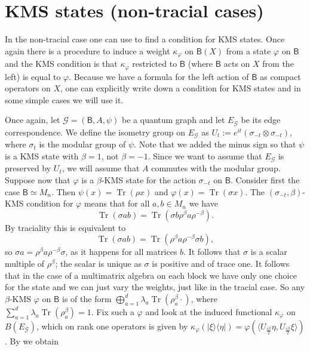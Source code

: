 \documentclass[a4paper,reqno]{amsart}
\numberwithin{equation}{section}
\numberwithin{theorem}{section}
\theoremstyle{definition}\newtheorem{definition}[theorem]{Definition}
\theoremstyle{definition}\newtheorem{remark}[theorem]{Remark}
\theoremstyle{definition}\newtheorem{example}[theorem]{Example}
\theoremstyle{definition}\newtheorem*{notation*}{Notation}
\theoremstyle{definition}\newtheorem*{convention*}{Convention}
\theoremstyle{definition}\newtheorem{observation}{Observation}
\theoremstyle{definition}\newtheorem*{acknowledgment*}{Acknowledgments}
\newcommand{\B}{\mathsf{B}}
\newcommand{\G}{\mathcal{G}}
\renewcommand{\op}[1]{\operatorname{#1}}
\begin{document}
\section{KMS states (non-tracial cases)}

In the non-tracial case one can use \cite[Theorem 3.2 and Theorem 3.5]{LN} to find a condition for KMS states. Once again there is a procedure to induce a weight $\kappa_{\varphi}$ on $\B(X)$ from a state $\varphi$ on $\B$ and the KMS condition is that $\kappa_{\varphi}$ restricted to $\B$ (where $\B$ acts on $X$ from the left) is equal to $\varphi$. Because we have a formula for the left action of $\B$ as compact operators on $X$, one can explicitly write down a condition for KMS states and in some simple cases we will use it.

Once again, let $\G=(\B,A,\psi)$ be a quantum graph and let $E_{\G}$ be its edge correspondence. We define the isometry group on $E_{\G}$ as $U_t := e^{it} (\sigma_{-t} \otimes \sigma_{-t})$, where $\sigma_{t}$ is the modular group of $\psi$. Note that  we added the minus sign so that $\psi$ is a KMS state with $\beta=1$, not $\beta=-1$. Since we want to assume that $E_{\G}$ is preserved by $U_{t}$, we will assume that $A$ commutes with the modular group. Suppose now that $\varphi$ is a $\beta$-KMS state for the action $\sigma_{-t}$ on $\B$. Consider first the case $\B \simeq M_n$. Then $\psi(x) =\op{Tr}(\rho x)$ and $\varphi(x) = \op{Tr}(\sigma x)$. The $(\sigma_{-t},\beta)$-KMS condition for $\varphi$ means that for all $a,b\in M_n$ we have
\[
\op{Tr}(\sigma a b) = \op{Tr}(\sigma b \rho^{\beta} a \rho^{-\beta}).
\]
By traciality this is equivalent to
\[
\op{Tr}(\sigma a b) = \op{Tr}(\rho^{\beta} a \rho^{-\beta} \sigma b),
 \]
 so $\sigma a = \rho^{\beta} a \rho^{-\beta}\sigma$, as it happens for all matrices $b$. It follows that $\sigma$ is a scalar multiple of $\rho^{\beta}$; the scalar is unique as $\sigma$ is positive and of trace one. It follows that in the case of a multimatrix algebra on each block we have only one choice for the state and we can just vary the weights, just like in the tracial case. So any $\beta$-KMS $\varphi$ on $\B$ is of the form $\bigoplus_{a=1}^{d} \lambda_{a} \op{Tr}(\rho_{a}^{\beta} \cdot)$, where $\sum_{a=1}^{d} \lambda_a \op{Tr}(\rho_a^{\beta}) = 1$. Fix such a $\varphi$ and look at the induced functional $\kappa_{\varphi}$ on $B(E_\G)$, which on rank one operators is given by $\kappa_{\varphi}(|\xi\rangle\langle \eta|) = \varphi(\langle U_{\frac{i\beta}{2}}\eta, U_{\frac{i \beta}{2}} \xi\rangle)$. By \cite[Theorem  2.5 and Theorem 2.12]{BHINW} we obtain
\end{document}

